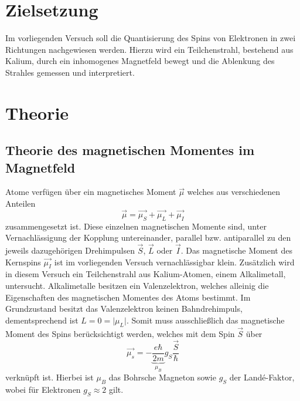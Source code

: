 \section{Zielsetzung}

Im vorliegenden Versuch soll die Quantisierung des Spins von Elektronen in zwei Richtungen nachgewiesen werden.
Hierzu wird ein Teilchenstrahl, bestehend aus Kalium, durch ein inhomogenes Magnetfeld bewegt und die Ablenkung des Strahles gemessen und interpretiert.

\section{Theorie}
\subsection{Theorie des magnetischen Momentes im Magnetfeld}
\label{sec:Theorie}
Atome verfügen über ein magnetisches Moment $\vec{\mu}$ welches aus verschiedenen Anteilen
\begin{equation}
  \vec{\mu} = \vec{\mu_S} + \vec{\mu_L} + \vec{\mu_I}
\end{equation}
zusammengesetzt ist.
Diese einzelnen magnetischen Momente sind, unter Vernachlässigung der Kopplung untereinander, parallel bzw. antiparallel zu den jeweils dazugehörigen Drehimpulsen $\vec{S}$, $\vec{L}$ oder $\vec{I}$.
Das magnetische Moment des Kernspins $\vec{\mu_I}$ ist im vorliegenden Versuch vernachlässigbar klein.
Zusätzlich wird in diesem Versuch ein Teilchenstrahl aus Kalium-Atomen, einem Alkalimetall, untersucht.
Alkalimetalle besitzen ein Valenzelektron, welches alleinig die Eigenschaften des magnetischen Momentes des Atoms bestimmt.
Im Grundzustand besitzt das Valenzelektron keinen Bahndrehimpuls, dementsprechend ist $L = 0 = \lvert \mu_L \rvert$. %
Somit muss ausschließlich das magnetische Moment des Spins berücksichtigt werden, welches mit dem Spin $\vec{S}$ über
\begin{equation}
  \vec{\mu_s} = - \underbrace{\frac{e \hbar}{2m}}_{\mu_B} g_S \frac{\vec{S}}{\hbar}
\end{equation}
verknüpft ist.
Hierbei ist $\mu_B$ das Bohrsche Magneton sowie $g_S$ der Land\'{e}-Faktor, wobei für Elektronen $g_S \approx 2$ gilt.

